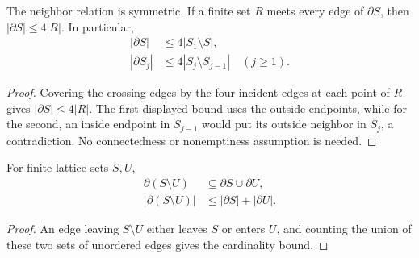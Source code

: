 \begin{lemma}
    \label{lem:area_law_ambient_boundary_layers}
    \leanok
    The neighbor relation is symmetric. If a finite set $R$ meets every edge
    of $\partial S$, then $|\partial S|\le4|R|$. In particular,
    \begin{align}
        |\partial S|   & \le4|S_1\setminus S|,                   \\
        |\partial S_j| & \le4|S_j\setminus S_{j-1}|\quad(j\ge1).
    \end{align}
\end{lemma}
\begin{proof}
    \leanok
    Covering the crossing edges by the four incident edges at each point of $R$
    gives $|\partial S|\le4|R|$.
    The first displayed bound uses the outside endpoints, while for the second,
    an inside endpoint in $S_{j-1}$ would put its outside neighbor in $S_j$, a
    contradiction. No connectedness or nonemptiness assumption is needed.
\end{proof}

\begin{lemma}
    \label{lem:area_law_ambient_boundary_difference}
    \leanok
    For finite lattice sets $S,U$,
    \begin{align}
        \partial(S\setminus U)   & \subseteq\partial S\cup\partial U, \\
        |\partial(S\setminus U)| & \le|\partial S|+|\partial U|.
    \end{align}
\end{lemma}
\begin{proof}
    \leanok
    An edge leaving $S\setminus U$ either leaves $S$ or enters $U$, and
    counting the union of these two sets of unordered edges gives the cardinality bound.
\end{proof}

